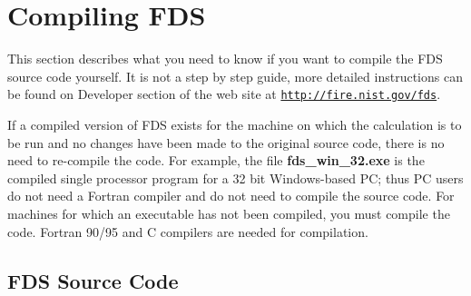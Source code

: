 \documentclass[11pt]{book}
\newcommand{\ct}{\tt\small}
\begin{document}
\chapter{Compiling FDS}
\label{info:compilation}

This section describes what you need to know if you want to compile the FDS source code yourself.
It is not a step by step guide, more detailed instructions can be found on Developer section of the web site at \href{http://fire.nist.gov/fds}{{\ct http://fire.nist.gov/fds}}.

If a compiled version of FDS exists for the machine on which the
calculation is to be run and no changes have been made to
the original source code, there is no need to re-compile the code.
For example, the file {\bf fds\_win\_32.exe} is the
compiled single processor program for a 32 bit Windows-based PC;
thus PC users do not need a
Fortran compiler and do not need to compile the source code.
For machines for which an executable has not been compiled, you must
compile the code. Fortran 90/95 and C compilers are needed for compilation.

\section{FDS Source Code}
\end{document}
